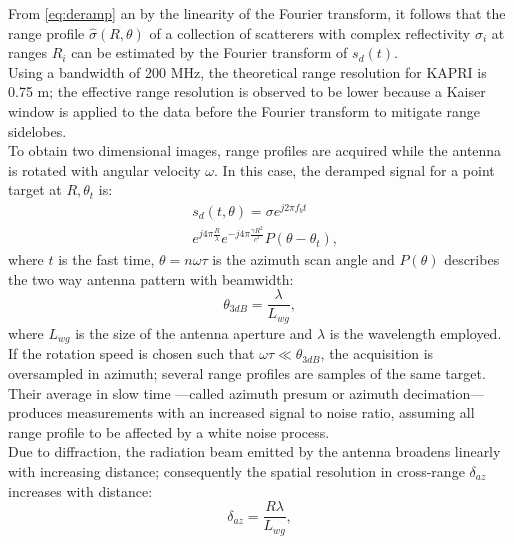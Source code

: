 From \eqref{eq:deramp} an by the linearity of the Fourier transform, it follows that the range profile $\hat{\sigma}\left(R, \theta\right)$ of a collection of scatterers with complex reflectivity $\sigma_i$ at ranges $R_{i}$ can be estimated by the Fourier transform of $s_{d}\left(t\right)$.\\
Using a bandwidth of 200 MHz, the theoretical range resolution for KAPRI is 0.75 m\cite{Strozzi2011}; the effective range resolution is observed to be lower because a Kaiser window is applied to the data before the Fourier transform to mitigate range sidelobes.\\
To obtain two dimensional images, range profiles are acquired while the antenna is rotated with angular velocity $\omega$. 
In this case, the deramped signal for a point target at $R,\theta_t$ is:
\begin{equation}\label{eq:signal_model}
	\begin{aligned}
	& s_{d}\left(t,\theta\right) = \sigma e^{j 2 \pi f_b t}   \\
	& e^{j 4 \pi \frac{R}{\lambda}}  e^{-j 4 \pi \frac{\gamma R^2}{c^2}} P\left(\theta - \theta_t\right),
	\end{aligned}
\end{equation} 
where $t$ is the fast time,  $\theta = n \omega \tau$ is the azimuth scan angle and $P\left(\theta\right)$ describes the two way antenna pattern with beamwidth:
\begin{equation}\label{eq:azimuth_resolution}
	\theta_{3dB} = \frac{\lambda}{L_{wg}},
\end{equation}
where $L_{wg}$ is the size of the antenna aperture and $\lambda$ is the wavelength employed.
If the rotation speed is chosen such that $\omega \tau \ll \theta_{3dB}$, the acquisition is oversampled in azimuth; several range profiles are samples of the same target. Their average in slow time  ---called azimuth presum or azimuth decimation--- produces measurements with an increased signal to noise ratio, assuming all range profile to be affected by a white noise process.\\
Due to diffraction, the radiation beam emitted by the antenna broadens linearly with increasing distance; consequently the spatial resolution in cross-range $\delta_{az}$ increases with distance:
\begin{equation}\label{eq:azimuth_ground_resolution}
	\delta_{az} = \frac{R \lambda}{L_{wg}},
\end{equation}
